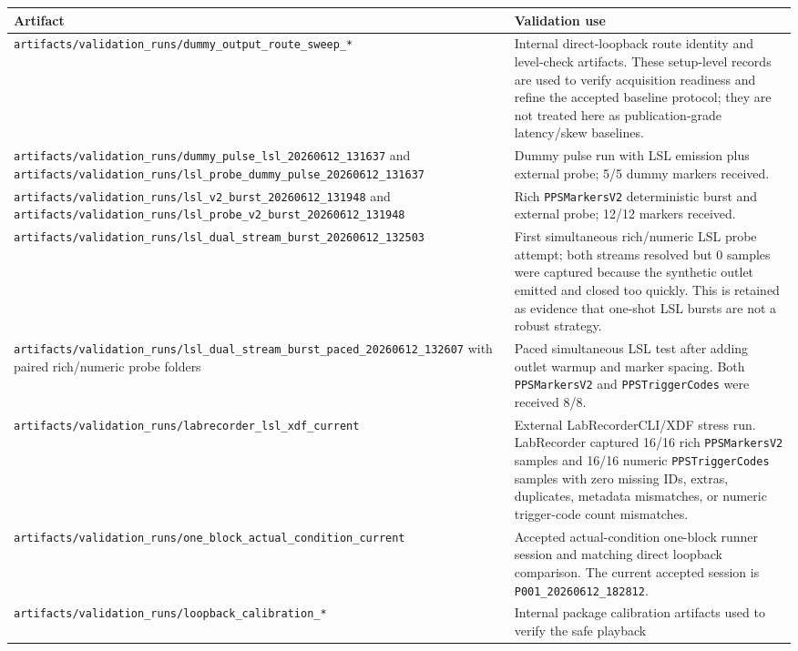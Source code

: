 \documentclass[11pt]{article}
\begin{document}
\begin{longtable}{|p{}|p{}|}
\hline
\textbf{Artifact} & \textbf{Validation use} \\
\hline
\texttt{artifacts/validation\_runs/dummy\_output\_route\_sweep\_*}
& Internal direct-loopback route identity and level-check artifacts. These
setup-level records are used to verify acquisition readiness and refine the
accepted baseline protocol; they are not treated here as publication-grade
latency/skew baselines. \\
\hline
\texttt{artifacts/validation\_runs/dummy\_pulse\_lsl\_20260612\_131637} and
\texttt{artifacts/validation\_runs/lsl\_probe\_dummy\_pulse\_20260612\_131637}
& Dummy pulse run with LSL emission plus external probe; 5/5 dummy markers
received. \\
\hline
\texttt{artifacts/validation\_runs/lsl\_v2\_burst\_20260612\_131948} and
\texttt{artifacts/validation\_runs/lsl\_probe\_v2\_burst\_20260612\_131948}
& Rich \texttt{PPSMarkersV2} deterministic burst and external probe; 12/12
markers received. \\
\hline
\texttt{artifacts/validation\_runs/lsl\_dual\_stream\_burst\_20260612\_132503}
& First simultaneous rich/numeric LSL probe attempt; both streams resolved but
0 samples were captured because the synthetic outlet emitted and closed too
quickly. This is retained as evidence that one-shot LSL bursts are not a robust
strategy. \\
\hline
\texttt{artifacts/validation\_runs/lsl\_dual\_stream\_burst\_paced\_20260612\_132607}
with paired rich/numeric probe folders & Paced simultaneous LSL test after
adding outlet warmup and marker spacing. Both \texttt{PPSMarkersV2} and
\texttt{PPSTriggerCodes} were received 8/8. \\
\hline
\texttt{artifacts/validation\_runs/labrecorder\_lsl\_xdf\_current}
& External LabRecorderCLI/XDF stress run. LabRecorder captured 16/16 rich
\texttt{PPSMarkersV2} samples and 16/16 numeric \texttt{PPSTriggerCodes}
samples with zero missing IDs, extras, duplicates, metadata mismatches, or
numeric trigger-code count mismatches. \\
\hline
\texttt{artifacts/validation\_runs/one\_block\_actual\_condition\_current}
& Accepted actual-condition one-block runner session and matching direct
loopback comparison. The current accepted session is
\texttt{P001\_20260612\_182812}. \\
\hline
\texttt{artifacts/validation\_runs/loopback\_calibration\_*}
& Internal package calibration artifacts used to verify the safe playback

\end{longtable}
\end{document}
